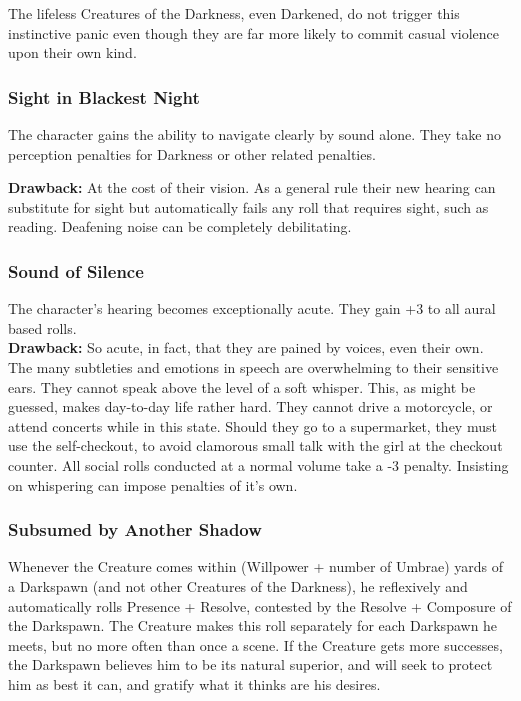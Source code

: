 The lifeless Creatures of the Darkness, even Darkened, do not trigger this instinctive panic even though they are far more likely to commit casual violence upon their own kind. 

\subsubsection*{Sight in Blackest Night}
The character gains the ability to navigate clearly by sound alone. They take no perception penalties for Darkness or other related penalties. 

\noindent \textbf{Drawback:} At the cost of their vision. As a general rule their new hearing can substitute for sight but automatically fails any roll that requires sight, such as reading. Deafening noise can be completely debilitating. 

\subsubsection*{Sound of Silence}
The character’s hearing becomes exceptionally acute. They gain +3 to all aural based rolls. \\

\noindent \textbf{Drawback:} So acute, in fact, that they are pained by voices, even their own. The many subtleties and emotions in speech are overwhelming to their sensitive ears. They cannot speak above the level of a soft whisper. This, as might be guessed, makes day-to-day life rather hard. They cannot drive a motorcycle, or attend concerts while in this state. Should they go to a supermarket, they must use the self-checkout, to avoid clamorous small talk with the girl at the checkout counter. All social rolls conducted at a normal volume take a -3 penalty. Insisting on whispering can impose penalties of it's own. 

\subsubsection*{Subsumed by Another Shadow}
Whenever the Creature comes within (Willpower + number of Umbrae) yards of a Darkspawn (and not other Creatures of the Darkness), he reflexively and automatically rolls Presence + Resolve, contested by the Resolve + Composure of the Darkspawn. The Creature makes this roll separately for each Darkspawn he meets, but no more often than once a scene. If the Creature gets more successes, the Darkspawn believes him to be its natural superior, and will seek to protect him as best it can, and gratify what it thinks are his desires. 

